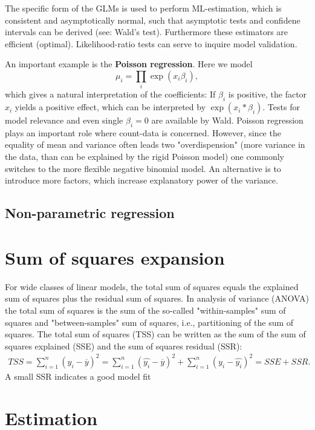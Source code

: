 \documentclass[12pt,a4paper]{amsart}
\theoremstyle{definition}
\theoremstyle{remark}
\numberwithin{equation}{section}
\begin{document}
 The specific form of the GLMs is used to perform ML-estimation, which is consistent and asymptotically normal, such that asymptotic tests and confidene intervals can be derived (see: Wald's test). Furthermore these estimators are efficient (optimal). Likelihood-ratio tests can serve to inquire model validation. 
 
 
 An important example is the \textbf{Poisson regression}. Here we model 
 $$ \mu_i= \prod_i \exp(x_i \beta_i),$$
which gives a natural interpretation of the coefficients: If $\beta_i$ is positive, the factor $x_i$ yields a positive effect, which can be interpreted by $\exp(x_i*\beta_i)$. Tests for model relevance and even single $\beta_i =0$ are available by Wald. Poisson regression plays an important role where count-data is concerned. However, since the equality of mean and variance often leads two "overdispension" (more variance in the data, than can be explained by the rigid Poisson model) one commonly switches to the more flexible negative binomial model. An alternative is to introduce more factors, which increase explanatory power of the variance. 



\subsection{Non-parametric regression}

\section{Sum of squares expansion}
For wide classes of linear models, the total sum of squares equals the explained sum of squares plus the residual sum of squares. In analysis of variance (ANOVA) the total sum of squares is the sum of the so-called "within-samples" sum of squares and "between-samples" sum of squares, i.e., partitioning of the sum of squares.
The total sum of squares (TSS) can be written as the sum of the sum of squares explained (SSE) and the sum of squares residual (SSR):
\begin{align*}
TSS= \sum_{i=1}^n \left(y_i-\overline{y}\right)^2 = \sum_{i=1}^n \left(\hat{y_i}-\overline{y}\right)^2+\sum_{i=1}^n \left(y_i-\hat{y_i}\right)^2=SSE+SSR.
\end{align*}
A small SSR indicates a good model fit


\section{Estimation}
\end{document}
